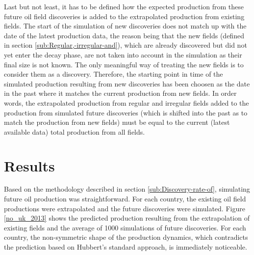 \documentclass[review]{elsarticle}
\begin{document}
Last but not least, it has to be defined how the expected production from these future oil field discoveries is added to the extrapolated production from existing fields. The start of the simulation of new discoveries does not match up with the date of the latest production data, the reason being that the new fields (defined in section \ref{sub:Regular,-irregular-and}), which are already discovered but did not yet enter the decay phase, are not taken into account in the simulation as their final size is not known. The only meaningful way of treating the new fields is to consider them as a discovery. Therefore, the starting point in time of the simulated production resulting from new discoveries has been choosen as the date in the past where it matches the current production from
new fields. In order words, the extrapolated production from regular and irregular fields added to the production from simulated future discoveries (which is shifted into the past as to match the production from new fields) must be equal to the current (latest available data) total production from all fields.


\section{Results\label{sec:Results}}

Based on the methodology described in section \ref{sub:Discovery-rate-of},
simulating future oil production was straightforward. For each country,
the existing oil field productions were extrapolated and the future discoveries were simulated. Figure \ref{no_uk_2013} shows the predicted production resulting from the extrapolation of existing fields and the average of 1000 simulations of future discoveries.
For each country, the non-symmetric shape of the production dynamics, which
contradicts the prediction based on Hubbert's standard approach, is immediately noticeable.
\end{document}

